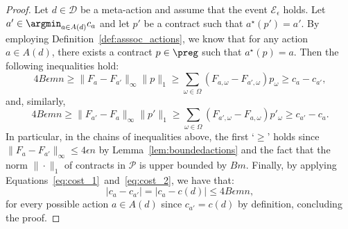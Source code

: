 \costactions*
\begin{proof}
	Let $d \in \mathcal{D}$ be a meta-action and assume that the event $\mathcal{E}_\epsilon$ holds. Let $a' \in \argmin_{a \in A(d)} c_a$ and let $p'$ be a contract such that $a^\star(p')=a'$. By employing Definition~\ref{def:asssoc_actions}, we know that for any action $a \in A(d)$, there exists a contract $p \in \preg$ such that $a^\star(p)=a$. Then the following inequalities hold:
	\begin{equation}\label{eq:cost_1}
		4B \epsilon m  n \ge \| {F}_{a} - {F}_{a'} \|_{\infty} \| p\|_{1}  \ge \sum_{\omega \in \Omega} \left( {F}_{a,\omega} - {F}_{a',\omega} \right) p_{\omega}  \ge  {c}_{a} - {c}_{a'},
	\end{equation} 
	and, similarly, 
	\begin{equation}\label{eq:cost_2}
		4B \epsilon m  n \ge \| {F}_{a'} - {F}_{a} \|_{\infty} \| p'\|_{1}  \ge \sum_{\omega \in \Omega} \left( {F}_{a',\omega} - {F}_{a,\omega} \right) p'_{\omega}  \ge  {c}_{a'} - {c}_{a} . 
	\end{equation} 
	In particular, in the chains of inequalities above, the first `$\geq $' holds since $\| F_{a} - {F}_{a'}\|_{\infty} \le 4 \epsilon n$ by Lemma~\ref{lem:boundedactions} and the fact that the norm $\|\cdot\|_1$ of contracts in $\mathcal{P}$ is upper bounded by $Bm$.
	Finally, by applying Equations~\eqref{eq:cost_1}~and~\eqref{eq:cost_2}, we have that:
	\begin{equation*}
	|  {c}_{a} - {c}_{a'} | =	|  {c}_{a} - c(d) |   \le 4 B \epsilon m  n, 
	\end{equation*} 
	for every possible action $a \in A(d)$ since $c_{a'}=c(d)$ by definition, concluding the proof. 
\end{proof}


